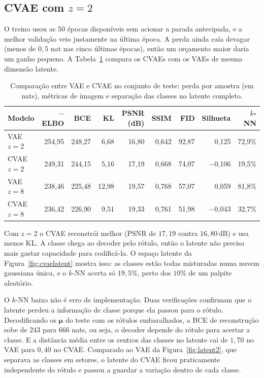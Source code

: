 \documentclass[11pt,a4paper]{article}
\begin{document}
\subsection{CVAE com $z = 2$}

O treino usou as $50$ épocas disponíveis sem acionar a parada antecipada, e a melhor validação veio justamente na última época. A perda ainda caía devagar (menos de $0{,}5$ nat nas cinco últimas épocas), então um orçamento maior daria um ganho pequeno. A Tabela~\ref{tab:cvae} compara os CVAEs com os VAEs de mesma dimensão latente.

\begin{table}[H]
\centering
\caption{Comparação entre VAE e CVAE no conjunto de teste: perda por amostra (em nats), métricas de imagem e separação das classes no latente completo.}
\label{tab:cvae}
\small
\begin{tabular}{lrrrrrrrr}
\toprule
Modelo & $-$ELBO & BCE & KL & PSNR (dB) & SSIM & FID & Silhueta & $k$-NN \\
\midrule
VAE $z = 2$  & 254,95 & 248,27 & 6,68  & 16,80 & 0,642 & 92,87 & 0,125    & 72,9\% \\
CVAE $z = 2$ & 249,31 & 244,15 & 5,16  & 17,19 & 0,668 & 74,07 & $-$0,106 & 19,5\% \\
\midrule
VAE $z = 8$  & 238,46 & 225,48 & 12,98 & 19,57 & 0,768 & 57,07 & 0,059    & 81,8\% \\
CVAE $z = 8$ & 236,42 & 226,90 & 9,51  & 19,33 & 0,761 & 51,98 & $-$0,043 & 32,7\% \\
\bottomrule
\end{tabular}
\end{table}

Com $z = 2$ o CVAE reconstrói melhor (PSNR de $17{,}19$ contra $16{,}80\,\mathrm{dB}$) e usa menos KL. A classe chega ao decoder pelo rótulo, então o latente não precisa mais gastar capacidade para codificá-la. O espaço latente da Figura~\ref{fig:cvaelatent} mostra isso: as classes estão todas misturadas numa nuvem gaussiana única, e o $k$-NN acerta só $19{,}5\%$, perto dos $10\%$ de um palpite aleatório.

O $k$-NN baixo não é erro de implementação. Duas verificações confirmam que o latente perdeu a informação de classe porque ela passou para o rótulo. Decodificando os $\boldsymbol{\mu}$ do teste com os rótulos embaralhados, a BCE de reconstrução sobe de $243$ para $666$ nats, ou seja, o decoder depende do rótulo para acertar a classe. E a distância média entre os centros das classes no latente cai de $1{,}70$ no VAE para $0{,}40$ no CVAE. Comparado ao VAE da Figura~\ref{fig:latent2}, que separava as classes em setores, o latente do CVAE ficou praticamente independente do rótulo e passou a guardar a variação dentro de cada classe.
\end{document}
